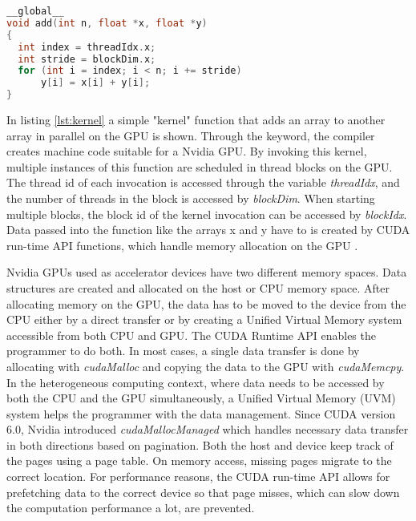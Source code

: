 \begin{lstlisting}[language=C++, caption=Simple CUDA kernel example \cite{EasyIntroductionCUDA2012}, label=lst:kernel]
__global__
void add(int n, float *x, float *y)
{
  int index = threadIdx.x;
  int stride = blockDim.x;
  for (int i = index; i < n; i += stride)
      y[i] = x[i] + y[i];
}
\end{lstlisting}
In listing \ref{lst:kernel} a simple "kernel" function that adds an array to another array in parallel on the GPU is shown. Through the \texttt{} keyword, the compiler creates machine code suitable for a Nvidia GPU. By invoking this kernel, multiple instances of this function are scheduled in thread blocks on the GPU. The thread id of each invocation is accessed through the variable \emph{threadIdx}, and the number of threads in the block is accessed by \emph{blockDim}. When starting multiple blocks, the block id of the kernel invocation can be accessed by \emph{blockIdx}.
Data passed into the function like the arrays x and y have to is created by CUDA run-time API functions, which handle memory allocation on the GPU \cite{MemoryManagement}.

Nvidia GPUs used as accelerator devices have two different memory spaces. Data structures are created and allocated on the host or CPU memory space. After allocating memory on the GPU, the data has to be moved to the device from the CPU either by a direct transfer or by creating a Unified Virtual Memory system accessible from both CPU and GPU. The CUDA Runtime API enables the programmer to do both. In most cases, a single data transfer is done by allocating with \emph{cudaMalloc} and copying the data to the GPU with \emph{cudaMemcpy}. In the heterogeneous computing context, where data needs to be accessed by both the CPU and the GPU simultaneously, a Unified Virtual Memory (UVM) system helps the programmer with the data management. Since CUDA version 6.0, Nvidia introduced \emph{cudaMallocManaged} which handles necessary data transfer in both directions based on pagination. \cite{gayatri_comparing_nodate} Both the host and device keep track of the pages using a page table. On memory access, missing pages migrate to the correct location.
For performance reasons, the CUDA run-time API allows for prefetching data to the correct device so that page misses, which can slow down the computation performance a lot, are prevented.


